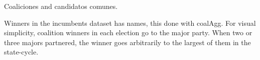 \documentclass[letter,12pt]{article}
\newcommand{\mc}{\multicolumn}
\begin{document}


Coaliciones and candidatos comunes.

Winners in the incumbents dataset has names, this done with coalAgg. For visual simplicity, coalition winners in each election go to the major party. When two or three majors partnered, the winner goes arbitrarily to the largest of them in the state-cycle. 
\end{document}
